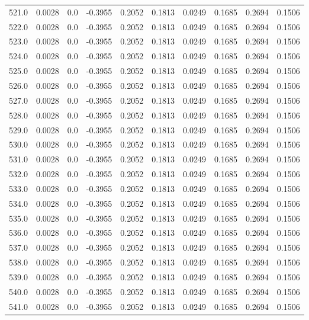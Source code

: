 \begin{longtable}{lrrrrrrrrr}
521.0 & 0.0028 & 0.0 & -0.3955 & 0.2052 & 0.1813 & 0.0249 & 0.1685 & 0.2694 & 0.1506 \\
522.0 & 0.0028 & 0.0 & -0.3955 & 0.2052 & 0.1813 & 0.0249 & 0.1685 & 0.2694 & 0.1506 \\
523.0 & 0.0028 & 0.0 & -0.3955 & 0.2052 & 0.1813 & 0.0249 & 0.1685 & 0.2694 & 0.1506 \\
524.0 & 0.0028 & 0.0 & -0.3955 & 0.2052 & 0.1813 & 0.0249 & 0.1685 & 0.2694 & 0.1506 \\
525.0 & 0.0028 & 0.0 & -0.3955 & 0.2052 & 0.1813 & 0.0249 & 0.1685 & 0.2694 & 0.1506 \\
526.0 & 0.0028 & 0.0 & -0.3955 & 0.2052 & 0.1813 & 0.0249 & 0.1685 & 0.2694 & 0.1506 \\
527.0 & 0.0028 & 0.0 & -0.3955 & 0.2052 & 0.1813 & 0.0249 & 0.1685 & 0.2694 & 0.1506 \\
528.0 & 0.0028 & 0.0 & -0.3955 & 0.2052 & 0.1813 & 0.0249 & 0.1685 & 0.2694 & 0.1506 \\
529.0 & 0.0028 & 0.0 & -0.3955 & 0.2052 & 0.1813 & 0.0249 & 0.1685 & 0.2694 & 0.1506 \\
530.0 & 0.0028 & 0.0 & -0.3955 & 0.2052 & 0.1813 & 0.0249 & 0.1685 & 0.2694 & 0.1506 \\
531.0 & 0.0028 & 0.0 & -0.3955 & 0.2052 & 0.1813 & 0.0249 & 0.1685 & 0.2694 & 0.1506 \\
532.0 & 0.0028 & 0.0 & -0.3955 & 0.2052 & 0.1813 & 0.0249 & 0.1685 & 0.2694 & 0.1506 \\
533.0 & 0.0028 & 0.0 & -0.3955 & 0.2052 & 0.1813 & 0.0249 & 0.1685 & 0.2694 & 0.1506 \\
534.0 & 0.0028 & 0.0 & -0.3955 & 0.2052 & 0.1813 & 0.0249 & 0.1685 & 0.2694 & 0.1506 \\
535.0 & 0.0028 & 0.0 & -0.3955 & 0.2052 & 0.1813 & 0.0249 & 0.1685 & 0.2694 & 0.1506 \\
536.0 & 0.0028 & 0.0 & -0.3955 & 0.2052 & 0.1813 & 0.0249 & 0.1685 & 0.2694 & 0.1506 \\
537.0 & 0.0028 & 0.0 & -0.3955 & 0.2052 & 0.1813 & 0.0249 & 0.1685 & 0.2694 & 0.1506 \\
538.0 & 0.0028 & 0.0 & -0.3955 & 0.2052 & 0.1813 & 0.0249 & 0.1685 & 0.2694 & 0.1506 \\
539.0 & 0.0028 & 0.0 & -0.3955 & 0.2052 & 0.1813 & 0.0249 & 0.1685 & 0.2694 & 0.1506 \\
540.0 & 0.0028 & 0.0 & -0.3955 & 0.2052 & 0.1813 & 0.0249 & 0.1685 & 0.2694 & 0.1506 \\
541.0 & 0.0028 & 0.0 & -0.3955 & 0.2052 & 0.1813 & 0.0249 & 0.1685 & 0.2694 & 0.1506 \\

\end{longtable}
